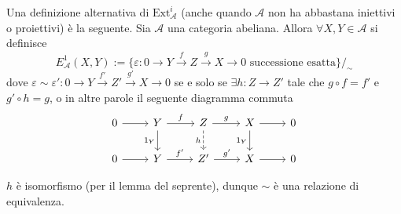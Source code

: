 
Una definizione alternativa di \(\mathrm{Ext}_\mathcal{A}^{i}\) (anche quando
\(\mathcal{A}\) non ha abbastana iniettivi o proiettivi) è la seguente. Sia
\(\mathcal{A}\) una categoria abeliana. Allora \(\forall X, Y \in \mathcal{A}\)
si definisce
\[
  E^{1}_\mathcal{A}{(X, Y)} := \{ \varepsilon : 0 \to Y \overset{f}{\to} Z
  \overset{g}{\to} X \to 0 \text{ successione esatta}\}/_\sim 
\]
dove \(\varepsilon \sim \varepsilon' : 0 \to Y \overset{f'}{\to} Z'
\overset{g'}{\to} X \to 0\) se e solo se \(\exists h : Z \to Z'\) tale che \(g
\circ f =f'\) e \(g' \circ h = g\), o in altre parole il seguente diagramma
commuta
\[ \begin{tikzcd}
	0 & Y & Z & X & 0 \\
	0 & Y & {Z'} & X & 0
	\arrow[from=1-1, to=1-2]
	\arrow["f", from=1-2, to=1-3]
	\arrow["{1_Y}"', from=1-2, to=2-2]
	\arrow["g", from=1-3, to=1-4]
	\arrow["h"', dashed, from=1-3, to=2-3]
	\arrow[from=1-4, to=1-5]
	\arrow["{1_Y}"', from=1-4, to=2-4]
	\arrow[from=2-1, to=2-2]
	\arrow["{f'}", from=2-2, to=2-3]
	\arrow["{g'}", from=2-3, to=2-4]
	\arrow[from=2-4, to=2-5]
\end{tikzcd} \]
\begin{remark}{}
    \(h\) è isomorfismo (per il lemma del seprente), dunque \(\sim \) è una
    relazione di equivalenza.
\end{remark}

